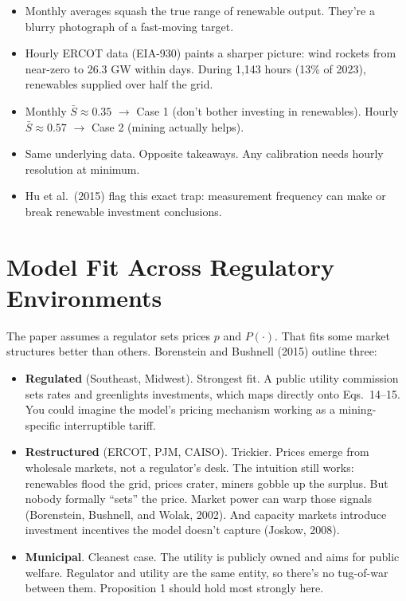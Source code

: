 \documentclass[11pt, letterpaper]{article}
\begin{document}
\begin{itemize}
\item Monthly averages squash the true range of renewable output. They're a blurry photograph of a fast-moving target.
\item Hourly ERCOT data (EIA-930) paints a sharper picture: wind rockets from near-zero to 26.3 GW within days. During 1,143 hours (13\% of 2023), renewables supplied over half the grid.
\item Monthly $\bar{S} \approx 0.35$ $\rightarrow$ Case 1 (don't bother investing in renewables). Hourly $\bar{S} \approx 0.57$ $\rightarrow$ Case 2 (mining actually helps).
\item Same underlying data. Opposite takeaways. Any calibration needs hourly resolution at minimum.
\item Hu et al.\ (2015) flag this exact trap: measurement frequency can make or break renewable investment conclusions.
\end{itemize}


\section{Model Fit Across Regulatory Environments}

The paper assumes a regulator sets prices $p$ and $P(\cdot)$. That fits some market structures better than others. Borenstein and Bushnell (2015) outline three:

\begin{itemize}
\item \textbf{Regulated} (Southeast, Midwest). Strongest fit. A public utility commission sets rates and greenlights investments, which maps directly onto Eqs.\ 14--15. You could imagine the model's pricing mechanism working as a mining-specific interruptible tariff.

\item \textbf{Restructured} (ERCOT, PJM, CAISO). Trickier. Prices emerge from wholesale markets, not a regulator's desk. The intuition still works: renewables flood the grid, prices crater, miners gobble up the surplus. But nobody formally ``sets'' the price. Market power can warp those signals (Borenstein, Bushnell, and Wolak, 2002). And capacity markets introduce investment incentives the model doesn't capture (Joskow, 2008).

\item \textbf{Municipal}. Cleanest case. The utility is publicly owned and aims for public welfare. Regulator and utility are the same entity, so there's no tug-of-war between them. Proposition 1 should hold most strongly here.
\end{itemize}
\end{document}
